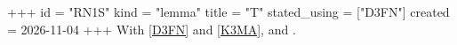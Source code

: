 +++
id = "RN1S"
kind = "lemma"
title = "T"
stated_using = ["D3FN"]
created = 2026-11-04
+++
With \ref{D3FN} and \ref{K3MA}, and  \cite[Thm.~1]{SmithJones23, Jones22}.

